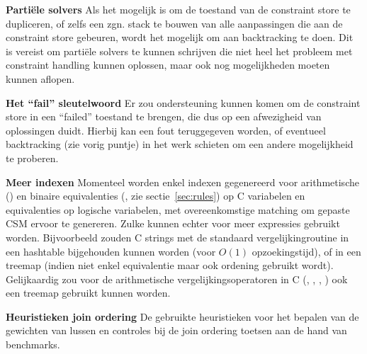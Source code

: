 {\bf Parti\"ele solvers} Als het mogelijk is om de toestand van de constraint store te dupliceren, of zelfs een zgn. stack te bouwen van alle aanpassingen die aan de constraint store gebeuren, wordt het mogelijk om aan backtracking te doen. Dit is vereist om parti\"ele solvers te kunnen schrijven die niet heel het probleem met constraint handling kunnen oplossen, maar ook nog mogelijkheden moeten kunnen aflopen.

{\bf Het ``fail'' sleutelwoord} Er zou ondersteuning kunnen komen om de constraint store in een ``failed'' toestand te brengen, die dus op een afwezigheid van oplossingen duidt. Hierbij kan een fout teruggegeven worden, of eventueel backtracking (zie vorig puntje) in het werk schieten om een andere mogelijkheid te proberen.

{\bf Meer indexen} Momenteel worden enkel indexen gegenereerd voor arithmetische (\code{==}) en binaire equivalenties (, zie sectie~\ref{sec:rules}) op C variabelen en equivalenties op logische variabelen, met overeenkomstige matching om gepaste CSM ervoor te genereren. Zulke kunnen echter voor meer expressies gebruikt worden. Bijvoorbeeld zouden C strings met de standaard vergelijkingroutine  in een hashtable bijgehouden kunnen worden (voor $O(1)$ opzoekingstijd), of in een treemap (indien niet enkel equivalentie maar ook ordening gebruikt wordt). Gelijkaardig zou voor de arithmetische vergelijkingsoperatoren in C (\code{>}, \code{<}, \code{>=}, \code{<=}) ook een treemap gebruikt kunnen worden.

{\bf Heuristieken join ordering} De gebruikte heuristieken voor het bepalen van de gewichten van lussen en controles bij de join ordering toetsen aan de hand van benchmarks.
